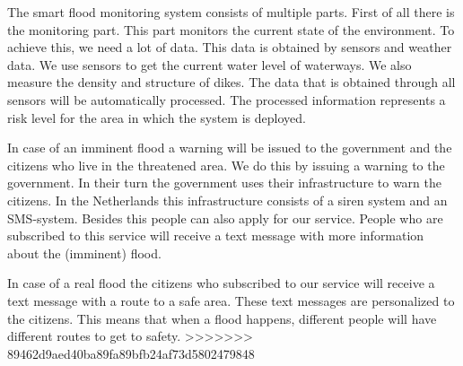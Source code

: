 The smart flood monitoring system consists of multiple parts. First of all there is the monitoring part. This part monitors the current state of the environment. To achieve this, we need a lot of data. This data is obtained by sensors and weather data. We use sensors to get the current water level of waterways. We also measure the density and structure of dikes. The data that is obtained through all sensors will be automatically processed. The processed information represents a risk level for the area in which the system is deployed.

In case of an imminent flood a warning will be issued to the government and the citizens who live in the threatened area. We do this by issuing a warning to the government. In their turn the government uses their infrastructure to warn the citizens. In the Netherlands this infrastructure consists of a siren system and an SMS-system. Besides this people can also apply for our service. People who are subscribed to this service will receive a text message with more information about the (imminent) flood. 

In case of a real flood the citizens who subscribed to our service will receive a text message with a route to a safe area. These text messages are personalized to the citizens. This means that when a flood happens, different people will have different routes to get to safety.
>>>>>>> 89462d9aed40ba89fa89bfb24af73d5802479848
